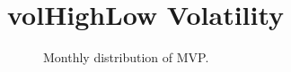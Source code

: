 



\newpage

\section{volHighLow Volatility}
%

\begin{figure}[H]
	\begin{subfigmatrix}{2}
	\end{subfigmatrix}
	\caption{Monthly distribution of MVP.}
	\label{fig:totalRiskMVP}
\end{figure}


